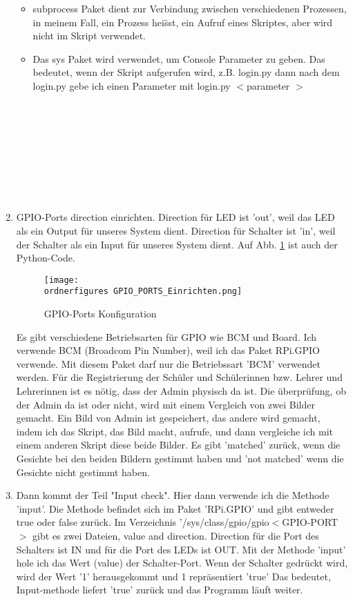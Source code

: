 \begin{enumerate}
\begin{itemize}
	 \item subprocess Paket dient zur Verbindung zwischen verschiedenen Prozessen, in meinem Fall, ein Prozess hei\"sst, ein Aufruf eines Skriptes, aber wird nicht im Skript verwendet. 
	 
	 \item Das sys Paket wird verwendet, um Console Parameter zu geben. Das bedeutet, wenn der Skript aufgerufen wird, z.B. login.py dann nach dem login.py gebe ich einen Parameter mit login.py $<$parameter $>$ \\ \\ \\ \\ \\ \\ \\ \\ \\ 
   \end{itemize}
	\item GPIO-Ports direction einrichten. Direction f\"ur LED ist 'out', weil das LED als ein Output f\"ur unseres System dient. Direction f\"ur Schalter ist 'in', weil der Schalter als ein Input f\"ur unseres System dient. Auf Abb. \ref{fig:GPIO-Ports Konfiguration} ist auch der Python-Code.
	\begin{figure}[H]
		\texttt{[image: \\ordnerfigures GPIO\_PORTS\_Einrichten.png]}
		\caption{GPIO-Ports Konfiguration}
		\label{fig:GPIO-Ports Konfiguration}
	\end{figure}
	Es gibt verschiedene Betriebsarten f\"ur GPIO wie BCM und Board.
	Ich verwende BCM (Broadcom Pin Number), weil ich das Paket RPi.GPIO verwende. Mit diesem Paket darf nur die Betriebssart 'BCM' verwendet werden. 
	\cite{gpiomode}
	F\"ur die Registrierung der Sch\"uler und Sch\"ulerinnen bzw. Lehrer und Lehrerinnen ist es n\"otig, dass der Admin physisch da ist. Die \"uberpr\"ufung, ob der Admin da ist oder nicht,  wird mit einem Vergleich von zwei Bilder gemacht. Ein Bild von Admin ist gespeichert, das andere wird gemacht, indem ich das Skript, das Bild macht, aufrufe, und dann vergleiche ich mit einem anderen Skript diese beide Bilder. Es gibt 'matched' zur\"uck, wenn die Gesichte bei den beiden Bildern gestimmt haben und 'not matched' wenn die Gesichte nicht gestimmt haben.
	\item Dann kommt der Teil "Input check". 
	Hier dann verwende ich die Methode 'input'. Die Methode befindet sich im Paket 'RPi.GPIO' und gibt entweder true oder false zur\"uck. 
	Im Verzeichnis '/sys/class/gpio/gpio$<$GPIO-PORT$>$ gibt es zwei Dateien, value and direction. Direction f\"ur die Port des Schalters ist IN und f\"ur die Port des LEDs ist OUT. Mit der Methode 'input' hole ich das Wert (value) der Schalter-Port. Wenn der Schalter gedr\"uckt wird, wird der Wert '1' herausgekommt und 1 repr\"asentiert 'true' Das bedeutet, Input-methode liefert 'true' zur\"uck und das Programm l\"auft weiter.
	

\end{enumerate}
